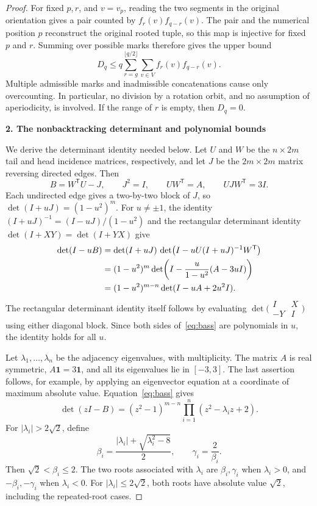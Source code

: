 \documentclass[11pt,a4paper]{article}
\newcommand{\ind}{\mathbf{1}}
\newcommand{\proofstep}[1]{%
  \par\addvspace{1.0\baselineskip}%
  \noindent\textbf{#1}\par\nobreak\smallskip\noindent\ignorespaces}
\begin{document}
\begin{proof}
For fixed $p,r$, and $v=v_p$, reading the two segments in the original
orientation gives a pair counted by $f_r(v)f_{q-r}(v)$. The pair and the
numerical position $p$ reconstruct the original rooted tuple, so this
map is injective for fixed $p$ and $r$. Summing over possible marks
therefore gives the upper bound
\begin{equation}\label{eq:collision-count}
 D_q\le
 q\sum_{r=g}^{\lfloor q/2\rfloor}\sum_{v\in V}
 f_r(v)f_{q-r}(v).
\end{equation}
Multiple admissible marks and inadmissible concatenations cause only
overcounting. In particular, no division by a rotation orbit, and no
assumption of aperiodicity, is involved. If the range of $r$ is empty,
then $D_q=0$.

\proofstep{2. The nonbacktracking determinant and polynomial bounds}
We derive the determinant identity needed below. Let $U$ and $W$ be the
$n\times2m$ tail and head incidence matrices, respectively, and let $J$
be the $2m\times2m$ matrix reversing directed edges. Then
\[
 B=W^{\mathsf T}U-J,\qquad J^2=I,\qquad
 UW^{\mathsf T}=A,\qquad UJW^{\mathsf T}=3I.
\]
Each undirected edge gives a two-by-two block of $J$, so
$\det(I+uJ)=(1-u^2)^m$. For $u\ne\pm1$, the identity
$(I+uJ)^{-1}=(I-uJ)/(1-u^2)$ and the rectangular determinant identity
$\det(I+XY)=\det(I+YX)$ give
\begin{align}
 \det(I-uB)
 &=\det(I+uJ)\,
   \det\!\left(I-uU(I+uJ)^{-1}W^{\mathsf T}\right)\notag\\
 &=(1-u^2)^m
   \det\!\left(I-\frac{u}{1-u^2}(A-3uI)\right)\notag\\
 &=(1-u^2)^{m-n}\det(I-uA+2u^2I).
 \label{eq:bass}
\end{align}
The rectangular determinant identity itself follows by evaluating
$\det\bigl(\begin{smallmatrix}I&X\\-Y&I\end{smallmatrix}\bigr)$ using
either diagonal block. Since both sides of~\eqref{eq:bass} are
polynomials in $u$, the identity holds for all $u$.

Let $\lambda_1,\ldots,\lambda_n$ be the adjacency eigenvalues, with
multiplicity. The matrix $A$ is real symmetric, $A\ind=3\ind$, and all
its eigenvalues lie in $[-3,3]$. The last assertion follows, for example,
by applying an eigenvector equation at a coordinate of maximum absolute
value. Equation~\eqref{eq:bass} gives
\begin{equation}\label{eq:characteristic}
 \det(zI-B)
 =(z^2-1)^{m-n}\prod_{i=1}^n(z^2-\lambda_i z+2).
\end{equation}
For $|\lambda_i|>2\sqrt2$, define
\begin{equation}\label{eq:real-roots}
 \beta_i=\frac{|\lambda_i|+\sqrt{\lambda_i^2-8}}2,
 \qquad \gamma_i=\frac2{\beta_i}.
\end{equation}
Then $\sqrt2<\beta_i\le2$. The two roots associated with $\lambda_i$
are $\beta_i,\gamma_i$ when $\lambda_i>0$, and
$-\beta_i,-\gamma_i$ when $\lambda_i<0$.
For $|\lambda_i|\le2\sqrt2$, both roots have absolute value $\sqrt2$,
including the repeated-root cases.


\end{proof}
\end{document}
